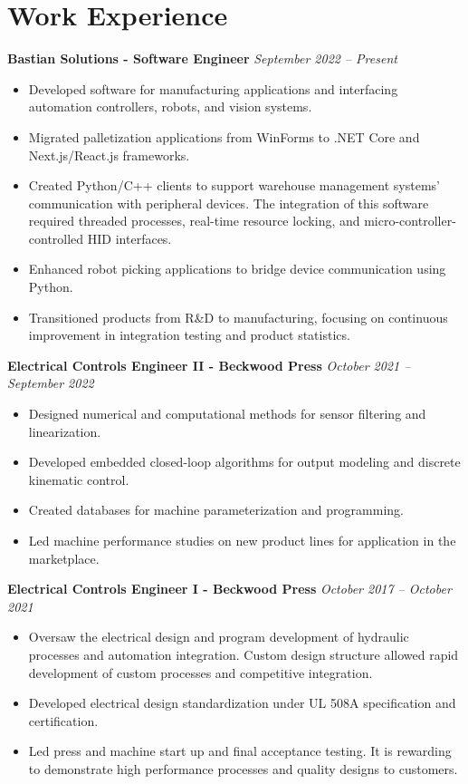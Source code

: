 \documentclass[letterpaper,10pt]{article} %
\newcommand{\job}[3]{
\textbf{#1 - #2} \hfill \textit{#3}
}
\begin{document}
\section{Work Experience}
\noindent\job{Bastian Solutions}{Software Engineer}{September 2022 -- Present}
\begin{itemize}[left=2em]
	\item Developed software for manufacturing applications and interfacing automation controllers, robots, and vision systems.
	\item Migrated palletization applications from WinForms to .NET Core and Next.js/React.js frameworks.
	\item Created Python/C++ clients to support warehouse management systems' communication with peripheral devices. The integration of this software required threaded processes, real-time resource locking, and micro-controller-controlled HID interfaces.
	\item Enhanced robot picking applications to bridge device communication using Python.
	\item Transitioned products from R\&D to manufacturing, focusing on continuous improvement in integration testing and product statistics.
\end{itemize}

\noindent\job{Electrical Controls Engineer II}{Beckwood Press}{October 2021 – September 2022}
\begin{itemize}[left=2em]
	\item Designed numerical and computational methods for sensor filtering and linearization.
	\item Developed embedded closed-loop algorithms for output modeling and discrete kinematic control.
	\item Created databases for machine parameterization and programming.
	\item Led machine performance studies on new product lines for application in the marketplace.
\end{itemize}

\noindent\job{Electrical Controls Engineer I}{Beckwood Press}{October 2017 – October 2021}
\begin{itemize}[left=2em]
	\item Oversaw the electrical design and program development of hydraulic processes and automation integration. Custom design
	structure allowed rapid development of custom processes and competitive integration.
	\item Developed electrical design standardization under UL 508A specification and certification.
	\item Led press and machine start up and final acceptance testing. It is rewarding to demonstrate high performance processes
	and quality designs to customers.
\end{itemize}
	
\end{document}
